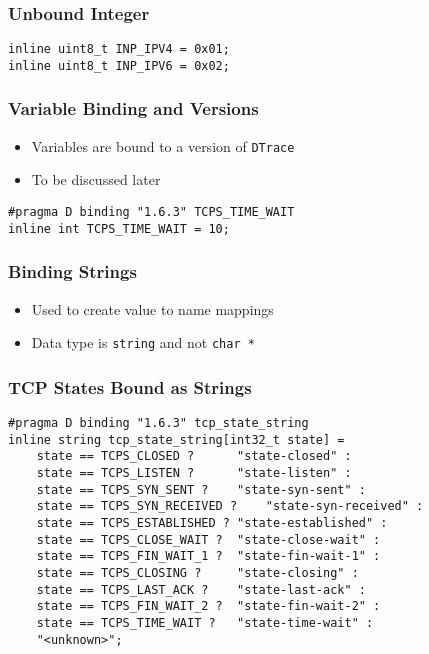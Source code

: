 \documentclass[pdftex]{beamer}
\begin{document}
\begin{frame}[fragile]
  \frametitle{Unbound Integer}
\begin{lstlisting}
inline uint8_t INP_IPV4	= 0x01;
inline uint8_t INP_IPV6 = 0x02;
\end{lstlisting}
\end{frame}

\begin{frame}[fragile]
  \frametitle{Variable Binding and Versions}
  \begin{itemize}
  \item Variables are bound to a version of \verb+DTrace+
  \item To be discussed later
  \end{itemize}
\begin{lstlisting}
#pragma D binding "1.6.3" TCPS_TIME_WAIT
inline int TCPS_TIME_WAIT =	10;
\end{lstlisting}
\end{frame}

\begin{frame}[fragile]
  \frametitle{Binding Strings}
  \begin{itemize}
  \item Used to create value to name mappings
  \item Data type is \verb+string+ and not \verb+char *+
  \end{itemize}
\end{frame}

\begin{frame}[fragile]
  \frametitle{TCP States Bound as Strings}
\begin{lstlisting}
#pragma D binding "1.6.3" tcp_state_string
inline string tcp_state_string[int32_t state] =
	state == TCPS_CLOSED ?		"state-closed" :
	state == TCPS_LISTEN ?		"state-listen" :
	state == TCPS_SYN_SENT ?	"state-syn-sent" :
	state == TCPS_SYN_RECEIVED ?	"state-syn-received" :
	state == TCPS_ESTABLISHED ?	"state-established" :
	state == TCPS_CLOSE_WAIT ?	"state-close-wait" :
	state == TCPS_FIN_WAIT_1 ?	"state-fin-wait-1" :
	state == TCPS_CLOSING ?		"state-closing" :
	state == TCPS_LAST_ACK ?	"state-last-ack" :
	state == TCPS_FIN_WAIT_2 ?	"state-fin-wait-2" :
	state == TCPS_TIME_WAIT ?	"state-time-wait" :
	"<unknown>";
\end{lstlisting}
\end{frame}
\end{document}
